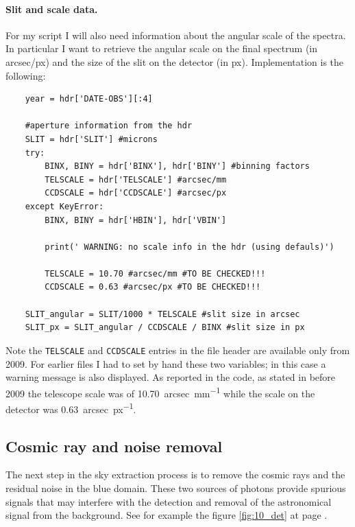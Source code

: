 \paragraph{Slit and scale data.} For my script I will also need information about the angular scale of the spectra. In particular I want to retrieve the angular scale on the final spectrum (in arcsec/px) and the size of the slit on the detector (in px). Implementation is the following:
\begin{lstlisting}	
	year = hdr['DATE-OBS'][:4]
	
	#aperture information from the hdr
	SLIT = hdr['SLIT'] #microns
	try:
		BINX, BINY = hdr['BINX'], hdr['BINY'] #binning factors
		TELSCALE = hdr['TELSCALE'] #arcsec/mm
		CCDSCALE = hdr['CCDSCALE'] #arcsec/px
	except KeyError:
		BINX, BINY = hdr['HBIN'], hdr['VBIN']
	
		print(' WARNING: no scale info in the hdr (using defauls)')
	
		TELSCALE = 10.70 #arcsec/mm #TO BE CHECKED!!!
		CCDSCALE = 0.63 #arcsec/px #TO BE CHECKED!!!
	
	SLIT_angular = SLIT/1000 * TELSCALE #slit size in arcsec
	SLIT_px = SLIT_angular / CCDSCALE / BINX #slit size in px
\end{lstlisting}
Note the \texttt{TELSCALE} and \texttt{CCDSCALE} entries in the file header are available only from 2009. For earlier files I had to set by hand these two variables; in this case a warning message is also displayed. As reported in the code, as stated in  before 2009 the telescope scale was of \SI{10.70}{arcsec\per{mm}} while the scale on the detector was \SI{0.63}{arcsec\per{px}}.

\subsection{Cosmic ray and noise removal}
The next step in the sky extraction process is to remove the cosmic rays and the residual noise in the blue domain. These two sources of photons provide spurious signals that may interfere with the detection and removal of the astronomical signal from the background. See for example the figure \ref{fig:10_det} at page \pageref{fig:10_det}.

